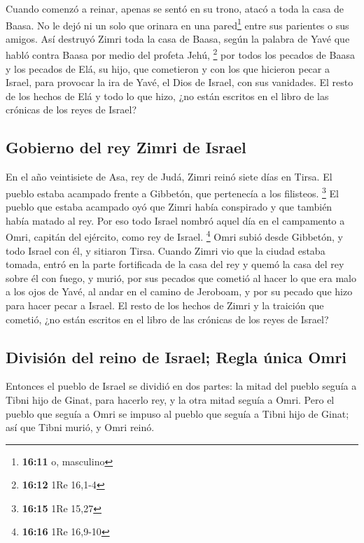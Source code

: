\begin{paracol}{2}
 Cuando comenzó a reinar, apenas se sentó en su trono,
atacó a toda la casa de Baasa. No le dejó ni un solo que orinara en una
pared\footnote{\textbf{16:11} o, masculino} entre sus parientes o sus
amigos.  Así destruyó Zimri toda la casa de Baasa, según
la palabra de Yavé que habló contra Baasa por medio del profeta Jehú,
\footnote{\textbf{16:12} 1Re 16,1-4}  por todos los
pecados de Baasa y los pecados de Elá, su hijo, que cometieron y con los
que hicieron pecar a Israel, para provocar la ira de Yavé, el Dios de
Israel, con sus vanidades.  El resto de los hechos de Elá
y todo lo que hizo, ¿no están escritos en el libro de las crónicas de
los reyes de Israel?

\hypertarget{gobierno-del-rey-zimri-de-israel}{%
\subsection{Gobierno del rey Zimri de
Israel}\label{gobierno-del-rey-zimri-de-israel}}

 En el año veintisiete de Asa, rey de Judá, Zimri reinó
siete días en Tirsa. El pueblo estaba acampado frente a Gibbetón, que
pertenecía a los filisteos. \footnote{\textbf{16:15} 1Re 15,27}
 El pueblo que estaba acampado oyó que Zimri había
conspirado y que también había matado al rey. Por eso todo Israel nombró
aquel día en el campamento a Omri, capitán del ejército, como rey de
Israel. \footnote{\textbf{16:16} 1Re 16,9-10}  Omri subió
desde Gibbetón, y todo Israel con él, y sitiaron Tirsa. 
Cuando Zimri vio que la ciudad estaba tomada, entró en la parte
fortificada de la casa del rey y quemó la casa del rey sobre él con
fuego, y murió,  por sus pecados que cometió al hacer lo
que era malo a los ojos de Yavé, al andar en el camino de Jeroboam, y
por su pecado que hizo para hacer pecar a Israel.  El
resto de los hechos de Zimri y la traición que cometió, ¿no están
escritos en el libro de las crónicas de los reyes de Israel?

\hypertarget{divisiuxf3n-del-reino-de-israel-regla-uxfanica-omri}{%
\subsection{División del reino de Israel; Regla única
Omri}\label{divisiuxf3n-del-reino-de-israel-regla-uxfanica-omri}}

 Entonces el pueblo de Israel se dividió en dos partes:
la mitad del pueblo seguía a Tibni hijo de Ginat, para hacerlo rey, y la
otra mitad seguía a Omri.  Pero el pueblo que seguía a
Omri se impuso al pueblo que seguía a Tibni hijo de Ginat; así que Tibni
murió, y Omri reinó.


\end{paracol}
